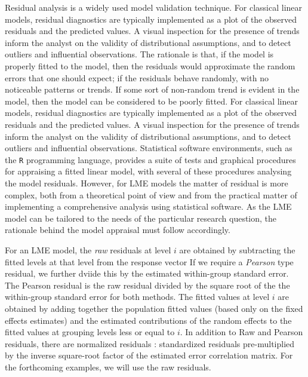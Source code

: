 \documentclass[12pt, a4paper]{report}
\theoremstyle{plain}
\theoremstyle{definition}
\theoremstyle{remark}
\begin{document}
	Residual analysis is a widely used model validation technique. For classical linear models, residual diagnostics are typically implemented as a plot of the observed residuals and the predicted values. A visual inspection for the presence of trends inform the analyst on the validity of distributional assumptions, and to detect outliers and influential observations. The rationale is that, if the model is properly fitted to the model, then the residuals would approximate the random errors that one should expect; if the residuals behave randomly, with no noticeable patterns or trends. If some sort of non-random trend is evident in the model, then the model can be considered to be poorly fitted. 	For classical linear models, residual diagnostics are typically implemented as a plot of the observed residuals and the predicted values. A visual inspection for the presence of trends inform the analyst on the validity of distributional assumptions, and to detect outliers and influential observations. Statistical software environments, such as the \texttt{R} programming language, provides a suite of tests and graphical procedures for appraising a fitted linear model, with several of these procedures analysing the model residuals. 	However, for LME models the matter of residual is more complex, both from a theoretical point of view and from the practical matter of implementing a comprehensive analysis using statistical software. As the LME model can be tailored to the needs of the particular research question, the rationale behind the model appraisal must follow accordingly.
	
	
	For an LME model, the \textit{raw} residuals at level $i$ are obtained by subtracting the fitted levels at that level from the response vector If we require a \textit{Pearson} type residual, we further dviide this by the estimated within-group standard error. The Pearson residual is the raw residual divided by the square root of the the within-group standard error for both methods. The fitted values at level $i$ are obtained by adding together the population fitted values (based only on the fixed effects estimates) and the estimated contributions of the random effects to the fitted values at grouping levels less or equal to $i$. In addition to Raw and Pearson residuals, there are normalized residuals : standardized residuals pre-multiplied by the inverse square-root factor of the estimated error correlation matrix. For the forthcoming examples, we will use the raw residuals.
	
\end{document}
